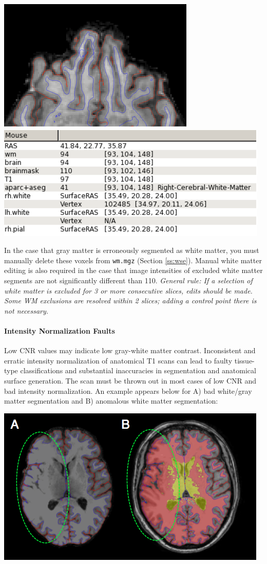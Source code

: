 \documentclass[paper=a4, fontsize=11pt]{scrartcl} %
\numberwithin{equation}{section} %
\numberwithin{figure}{section} %
\numberwithin{table}{section} %
\begin{document}
\includegraphics[scale=0.6]{ofc1.png}\includegraphics[scale=0.5]{ex1.png}

In the case that gray matter is erroneously segmented as white matter, you must manually delete these voxels from \texttt{wm.mgz} (Section \ref{ss:wse}).  Manual white matter editing is also required in the case that image intensities of excluded white matter segments are not significantly different than 110. \textit{General rule: If a selection of white matter is excluded for 3 or more consecutive slices, edits should be made.  Some WM exclusions are resolved within 2 slices; adding a control point there is not necessary.}

\paragraph{Intensity Normalization Faults}  Low CNR values may indicate low gray-white matter contrast.  Inconsistent and erratic intensity normalization of anatomical T1 scans can lead to faulty tissue-type classifications and substantial inaccuracies in segmentation and anatomical surface generation.  The scan must be thrown out in most cases of low CNR and bad intensity normalization.  An example appears below for A) bad white/gray matter segmentation and B) anomalous white matter segmentation:

\includegraphics[scale=0.6]{intensity.png}
\end{document}
